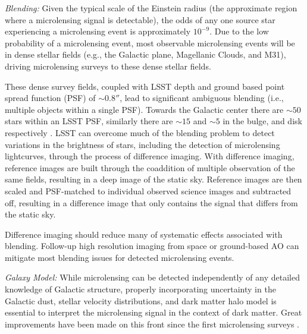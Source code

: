 \emph{Blending:} Given the typical scale  of the Einstein radius (the approximate region where a microlensing signal is detectable), the odds of any one source star experiencing a microlensing event is approximately $10^{-9}$. Due to the low probability of a microlensing event, most observable microlensing events will be in dense stellar fields (e.g., the Galactic plane, Magellanic Clouds, and M31), driving microlensing surveys to these dense stellar fields.

These dense survey fields, coupled with LSST depth and ground based point spread function (PSF) of $\sim0.8''$, lead to significant ambiguous blending (i.e., multiple objects within a single PSF).
Towards the Galactic center there are $\sim50$ stars within an LSST PSF, similarly there are $\sim15$ and $\sim5$ in the bulge, and disk respectively \citep{arXiv:1806.06372}.
LSST can overcome much of the blending problem to detect variations in the brightness of stars, including the detection of microlensing lightcurves, through the process of difference imaging.
With difference imaging, reference images are built through the coaddition of multiple observation of the same fields, resulting in a deep image of the static sky. Reference images are then scaled and PSF-matched to individual observed science images and subtracted off, resulting in a difference image that only contains the signal that differs from the static sky. 

Difference imaging should reduce many of systematic effects associated with blending. Follow-up high resolution imaging from space or ground-based AO can mitigate most blending issues for detected microlensing events.

\emph{Galaxy Model:} While microlensing can be detected independently of any detailed knowledge of Galactic structure, properly incorporating uncertainty in the Galactic dust, stellar velocity distributions, and dark matter halo model is essential to interpret the microlensing signal in the context of dark matter.
Great improvements have been made on this front since the first microlensing surveys \citep[e.g.,][]{2018MNRAS.479.2889C}.



